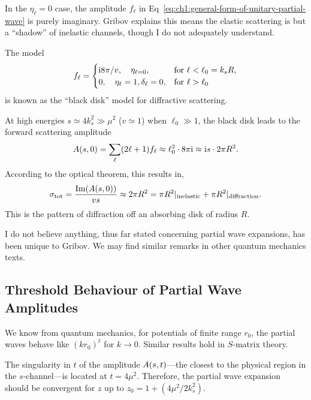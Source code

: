 \M
In the $\eta_{\ell}=0$ case, the amplitude $f_{\ell}$ in
Eq~\eqref{eq:ch1:general-form-of-unitary-partial-wave} is purely
imaginary. Gribov explains this means the elastic scattering is but a
``shadow'' of inelastic channels, though I do not adequately understand.

The model
\begin{equation}
  f_{\ell} = \begin{cases}
    \mathrm{i} 8\pi/v,\quad \eta_{\ell=0}, & \mbox{for }\ell<\ell_{0}=k_{s}R,\\
    0,\quad \eta_{\ell}=1,\delta_{\ell}=0, & \mbox{for } \ell>\ell_{0}
  \end{cases}
\end{equation}
is known as the ``black disk'' model for diffractive scattering.

\M
At high energies $s\simeq 4k_{s}^{2}\gg\mu^{2}$ ($v\simeq 1$) when
$\ell_{0}\gg1$, the black disk leads to the forward scattering amplitude
\begin{equation}
A(s,0) = \sum_{\ell}(2\ell+1)f_{\ell}\approx
\ell_{0}^{2}\cdot8\pi\mathrm{i}\approx\mathrm{i} s\cdot 2\pi R^{2}.
\end{equation}
According to the optical theorem, this results in,
\begin{equation}
\sigma_{\text{tot}} = \frac{\operatorname{Im}(A(s,0))}{vs}\approx2\pi R^{2}=\pi R^{2}|_{\text{inelastic}}+\pi
R^{2}|_{\text{diffraction}}.
\end{equation}
This is the pattern of diffraction off an absorbing disk of radius $R$.

I do not believe anything, thus far stated concerning partial wave
expansions, has been unique to Gribov. We may find similar remarks in
other quantum mechanics texts.

\subsection{Threshold Behaviour of Partial Wave Amplitudes}

\M We know from quantum mechanics, for potentials of finite range
$r_{0}$, the partial waves behave like $(kr_{0})^{\ell}$ for $k\to 0$.
Similar results hold in $S$-matrix theory.

\M The singularity in $t$ of the amplitude $A(s,t)$---the
closest to the physical region in the $s$-channel---is located at
$t=4\mu^{2}$. Therefore, the partial wave expansion should be convergent
for $z$ up to $z_{0}=1 + (4\mu^{2}/2k_{s}^{2})$.

